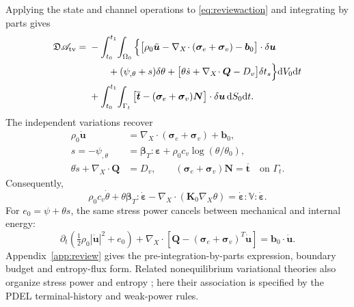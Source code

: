\documentclass[11pt,a4paper]{article}
\theoremstyle{remark}\newtheorem{remark}{Remark}
\numberwithin{equation}{section}
\newcommand{\dd}{\mathrm{d}}
\newcommand{\grad}{\nabla}
\begin{document}
Applying the state and channel operations to \eqref{eq:reviewaction} and integrating by parts gives
\begin{equation}
\begin{aligned}
\mathfrak D\mathscr A_{\rm tv}={}&-\int_{t_0}^{t_1}\!\int_{\Omega_0}
\Big\{\big[\rho_0\ddot{\boldsymbol u}
-\grad_X\!\cdot(\boldsymbol\sigma_e+\boldsymbol\sigma_v)-\boldsymbol b_0\big]
\cdot\delta\boldsymbol u\\
&\qquad +(\psi_{,\theta}+s)\delta\theta
+\big[\theta\dot s+\grad_X\!\cdot\boldsymbol Q-D_v\big]\delta t_s\Big\}\dd V_0\dd t\\
&+\int_{t_0}^{t_1}\!\int_{\Gamma_t}
\big[\overline{\boldsymbol t}-(\boldsymbol\sigma_e+\boldsymbol\sigma_v)\boldsymbol N\big]
\cdot\delta\boldsymbol u\,\dd S_0\dd t.
\end{aligned}
\label{eq:reviewfirstvariation}
\end{equation}
The independent variations recover
\begin{equation}
\begin{aligned}
\rho_0\ddot{\boldsymbol u}
&=\grad_X\!\cdot(\boldsymbol\sigma_e+\boldsymbol\sigma_v)+\boldsymbol b_0,\\
s=-\psi_{,\theta}
&=\boldsymbol\beta_T:\boldsymbol\varepsilon+\rho_0c_v\log(\theta/\theta_0),\\
\theta\dot s+\grad_X\!\cdot\boldsymbol Q&=D_v,
\qquad (\boldsymbol\sigma_e+\boldsymbol\sigma_v)\boldsymbol N
=\overline{\boldsymbol t}\quad\text{on }\Gamma_t.
\end{aligned}
\label{eq:reviewequations}
\end{equation}
Consequently,
\begin{equation}
\rho_0c_v\dot\theta
+\theta\boldsymbol\beta_T:\dot{\boldsymbol\varepsilon}
-\grad_X\!\cdot(\boldsymbol K_0\grad_X\theta)
=\dot{\boldsymbol\varepsilon}:\mathbb V:\dot{\boldsymbol\varepsilon}.
\label{eq:reviewtemperature}
\end{equation}
For $e_0=\psi+\theta s$, the same stress power cancels between mechanical and internal energy:
\begin{equation}
\partial_t\left(\tfrac12\rho_0|\dot{\boldsymbol u}|^2+e_0\right)
+\grad_X\!\cdot\left[\boldsymbol Q
-(\boldsymbol\sigma_e+\boldsymbol\sigma_v)^T\dot{\boldsymbol u}\right]
=\boldsymbol b_0\cdot\dot{\boldsymbol u}.
\label{eq:reviewenergy}
\end{equation}
Appendix~\ref{app:review} gives the pre-integration-by-parts expression, boundary budget and entropy-flux form. Related nonequilibrium variational theories also organize stress power and entropy \citep{GayBalmaz2017a,GayBalmaz2017b}; here their association is specified by the PDEL terminal-history and weak-power rules.
\end{document}
